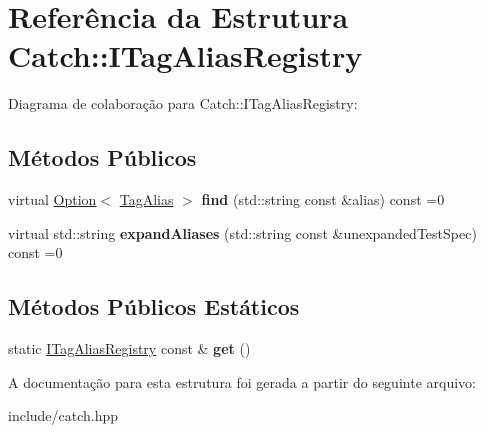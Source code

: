 \hypertarget{structCatch_1_1ITagAliasRegistry}{}\section{Referência da Estrutura Catch\+:\+:I\+Tag\+Alias\+Registry}
\label{structCatch_1_1ITagAliasRegistry}


Diagrama de colaboração para Catch\+:\+:I\+Tag\+Alias\+Registry\+:
\subsection*{Métodos Públicos}
\begin{DoxyCompactItemize}
\item 
virtual \hyperlink{classCatch_1_1Option}{Option}$<$ \hyperlink{structCatch_1_1TagAlias}{Tag\+Alias} $>$ {\bfseries find} (std\+::string const \&alias) const =0\hypertarget{structCatch_1_1ITagAliasRegistry_a7d2fba4d39cfcc62c2695fcde4f989c3}{}\label{structCatch_1_1ITagAliasRegistry_a7d2fba4d39cfcc62c2695fcde4f989c3}

\item 
virtual std\+::string {\bfseries expand\+Aliases} (std\+::string const \&unexpanded\+Test\+Spec) const =0\hypertarget{structCatch_1_1ITagAliasRegistry_ae729a7532faf7466db1a157ce0395170}{}\label{structCatch_1_1ITagAliasRegistry_ae729a7532faf7466db1a157ce0395170}

\end{DoxyCompactItemize}
\subsection*{Métodos Públicos Estáticos}
\begin{DoxyCompactItemize}
\item 
static \hyperlink{structCatch_1_1ITagAliasRegistry}{I\+Tag\+Alias\+Registry} const \& {\bfseries get} ()\hypertarget{structCatch_1_1ITagAliasRegistry_aa9d0f008f49473389c7abf6071f137a7}{}\label{structCatch_1_1ITagAliasRegistry_aa9d0f008f49473389c7abf6071f137a7}

\end{DoxyCompactItemize}


A documentação para esta estrutura foi gerada a partir do seguinte arquivo\+:\begin{DoxyCompactItemize}
\item 
include/catch.\+hpp\end{DoxyCompactItemize}
